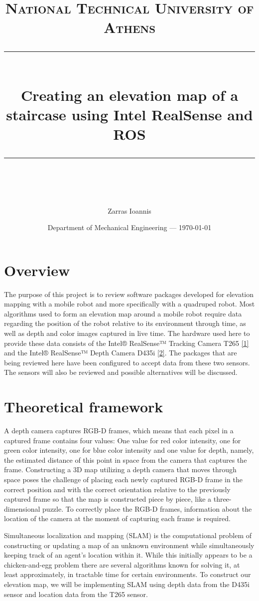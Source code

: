 \documentclass{article}
\title{	
	\normalfont\normalsize
	\textsc{National Technical University of Athens}\\ %
	\vspace{25pt} %
	\rule{\linewidth}{0.5pt}\\ %
	\vspace{20pt} %
	{\LARGE Creating an elevation map of a staircase using 
Intel RealSense and ROS}\\ %
	\vspace{12pt} %
	\rule{\linewidth}{2pt}\\ %
	\vspace{12pt} %
}
\author{\LARGE Zarras Ioannis} %
\date{Department of Mechanical Engineering --- \today}
\begin{document}
\maketitle

\section{Overview}

The purpose of this project is to review software packages developed for elevation mapping with a mobile robot and more specifically with a quadruped robot. Most algorithms used to form an elevation map around a mobile robot require data regarding the position of the robot relative to its environment through time, as well as depth and color images captured in live time. The hardware used here to provide these data consists of the Intel® RealSense™ Tracking Camera T265 \href{https://www.intelrealsense.com/tracking-camera-t265/}{[1]} and the  Intel® RealSense™ Depth Camera D435i \href{https://www.intelrealsense.com/depth-camera-d435i/}{[2]}. The packages that are being reviewed here have been configured to accept data from these two sensors. The sensors will also be reviewed and possible alternatives will be discussed.

\section{Theoretical framework}

A depth camera captures RGB-D frames, which means that each pixel in a captured frame contains four values: One value for red color intensity, one for green color intensity, one for blue color intensity and one value for depth, namely, the estimated distance of this point in space from the camera that captures the frame. Constructing a 3D map utilizing a depth camera that moves through space poses the challenge of placing each newly captured RGB-D frame in the correct position and with the correct orientation relative to the previously captured frame so that the map is constructed piece by piece, like a three-dimensional puzzle. To correctly place the RGB-D frames, information about the location of the camera at the moment of capturing each frame is required.

Simultaneous localization and mapping (SLAM) is the computational problem of constructing or updating a map of an unknown environment while simultaneously keeping track of an agent's location within it. While this initially appears to be a chicken-and-egg problem there are several algorithms known for solving it, at least approximately, in tractable time for certain environments.
To construct our elevation map, we will be implementing SLAM using depth data from the D435i sensor and location data from the T265 sensor.
\end{document}
